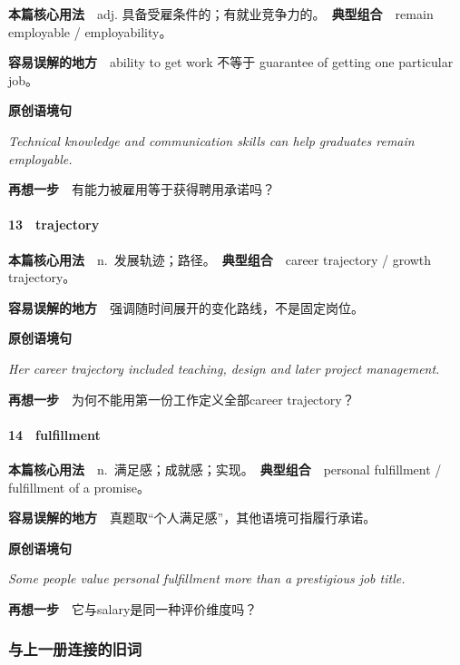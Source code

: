 \documentclass[
  11pt,
]{ctexart}
\renewenvironment{quote}{\begin{tcolorbox}[enhanced,breakable,colback=sand,colframe=primary!22,boxrule=0.4pt,arc=2pt,left=2.6mm,right=2.6mm,top=1.6mm,bottom=1.6mm]\itshape}{\end{tcolorbox}}
\begin{document}
\textbf{本篇核心用法}　adj.
具备受雇条件的；有就业竞争力的。　\textbf{典型组合}　remain employable /
employability。

\textbf{容易误解的地方}　ability to get work 不等于 guarantee of getting
one particular job。

\textbf{原创语境句}

\begin{quote}
Technical knowledge and communication skills can help graduates remain
employable.
\end{quote}

\textbf{再想一步}　有能力被雇用等于获得聘用承诺吗？

\paragraph{13　trajectory}\label{trajectory}

\textbf{本篇核心用法}　n.~发展轨迹；路径。　\textbf{典型组合}　career
trajectory / growth trajectory。

\textbf{容易误解的地方}　强调随时间展开的变化路线，不是固定岗位。

\textbf{原创语境句}

\begin{quote}
Her career trajectory included teaching, design and later project
management.
\end{quote}

\textbf{再想一步}　为何不能用第一份工作定义全部career trajectory？

\paragraph{14　fulfillment}\label{fulfillment}

\textbf{本篇核心用法}　n.~满足感；成就感；实现。　\textbf{典型组合}　personal
fulfillment / fulfillment of a promise。

\textbf{容易误解的地方}　真题取``个人满足感''，其他语境可指履行承诺。

\textbf{原创语境句}

\begin{quote}
Some people value personal fulfillment more than a prestigious job
title.
\end{quote}

\textbf{再想一步}　它与salary是同一种评价维度吗？

\subsubsection{与上一册连接的旧词}\label{ux4e0eux4e0aux4e00ux518cux8fdeux63a5ux7684ux65e7ux8bcd}
\end{document}
